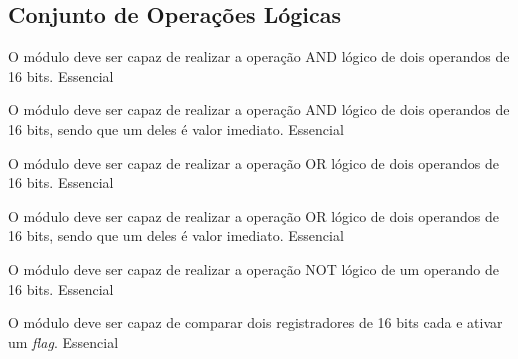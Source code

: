 \subsection{Conjunto de Operações Lógicas} 
  
    \begin{functional}
    
      {O módulo deve ser capaz de realizar a operação AND lógico de dois operandos de 16 bits.}
      {Essencial}
      
      {O módulo deve ser capaz de realizar a operação AND lógico de dois operandos de 16 bits, sendo que um deles é valor imediato.}
      {Essencial}

      {O módulo deve ser capaz de realizar a operação OR lógico de dois operandos de 16 bits.}
      {Essencial}  
      
      {O módulo deve ser capaz de realizar a operação OR lógico de dois operandos de 16 bits, sendo que um deles é valor imediato.}
      {Essencial} 
      
      {O módulo deve ser capaz de realizar a operação NOT lógico de um operando de 16 bits.}
      {Essencial}   
      
      {O módulo deve ser capaz de comparar dois registradores de 16 bits cada e ativar um \textit{flag}.}
      {Essencial}
      
    \end{functional}